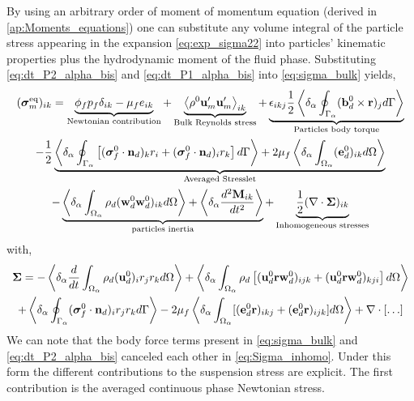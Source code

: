 By using an arbitrary order of moment of momentum equation (derived in \ref{ap:Moments_equations}) one can substitute any volume integral of the particle stress appearing in the expansion \ref{eq:exp_sigma22} into particles' kinematic properties plus the hydrodynamic moment of the fluid phase. 
Substituting \ref{eq:dt_P2_alpha_bis} and \ref{eq:dt_P1_alpha_bis} into \ref{eq:sigma_bulk} yields, 
\begin{multline}
    (\bm{\sigma}^\text{eq}_m)_{ik}
    = 
    \underbrace{
        \phi_f p_f 
    \delta_{ik}
    - \mu_f e_{ik} 
    }_\text{Newtonian contribution}
    + \underbrace{\avg{\rho^0 \textbf{u}'_m\textbf{u}'_m}_{ik}}_\text{Bulk Reynolds stress}
    + \underbrace{\epsilon_{ikj} \frac{1}{2}\pSavg{ (\textbf{b}_d^0 \times \textbf{r})_j}}_\text{Particles body torque}\\
    - \frac{1}{2}\underbrace{\pSavg{\left[
        (\bm{\sigma}_f^0 \cdot \textbf{n}_d)_kr_i  
        + (\bm{\sigma}_f^0 \cdot \textbf{n}_d)_i r_k
    \right]}
    + 2 \mu_f \pOavg{(\textbf{e}_d^0)_{ik}}}_\text{Averaged Stresslet}\\
    - \underbrace{\pOavg{ \rho_d (\textbf{w}_d^0\textbf{w}_d^0  )_{ik}}
    + \pavg{\frac{d^2 \textbf{M}_{ik}}{dt^2}  }}_\text{particles inertia}
    + \underbrace{\frac{1}{2} (\div\bm{\Sigma})_{ik}}_\text{Inhomogeneous stresses}
    \label{eq:stress_bulk_explicit}
\end{multline}
with,
\begin{multline}
    \bm{\Sigma}
    = 
    - \pavg{\ddt\intO{ \rho_d (\textbf{u}_d^0)_i r_j r_k }}
    + \pOavg{ 
        \rho_d \left[
        (\textbf{u}^0_d\textbf{r}\textbf{w}_d^0)_{ijk} +  (\textbf{u}^0_d\textbf{r}\textbf{w}_d^0)_{kji}
    \right]
    }\\
    +\pSavg{  (\bm{\sigma}_f^0 \cdot \textbf{n}_d)_i r_{j}  r_{k}  }
    - 2 \mu_f \pOavg{[( \textbf{e}_d^0 \textbf{r})_{ikj}
    + ( \textbf{e}_d^0 \textbf{r})_{ijk}]} + \div[\ldots]
    \label{eq:Sigma_inhomo}
\end{multline}
We can note that the body force terms present in \ref{eq:sigma_bulk} and \ref{eq:dt_P2_alpha_bis} canceled each other in \ref{eq:Sigma_inhomo}. 
Under this form the different contributions to the suspension stress are explicit. 
The first contribution is the averaged continuous phase Newtonian stress. 
